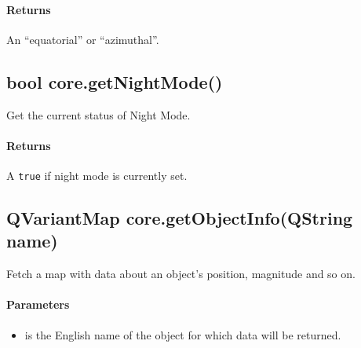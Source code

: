 \paragraph{Returns}
An ``equatorial'' or ``azimuthal''.

\subsection{bool core.getNightMode()}
\label{sec:ScriptingAPI:core:getNightMode}
Get the current status of Night Mode.

\paragraph{Returns}
A \texttt{true} if night mode is currently set.

\subsection{QVariantMap core.getObjectInfo(QString name)}
\label{sec:ScriptingAPI:core:getObjectInfo}
Fetch a map with data about an object's position, magnitude and so on.

\paragraph{Parameters}
\begin{itemize}
\item {} is the English name of the object for which data will be returned.
\end{itemize}

